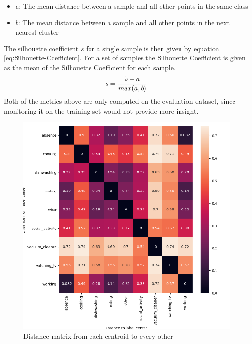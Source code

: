 \begin{itemize}
\setlength\itemsep{0em}
    \item $a$: The mean distance between a sample and all other points in the same class
    \item $b$: The mean distance between a sample and all other points in the next nearest cluster
\end{itemize}
The silhouette coefficient $s$ for a single sample is then given by equation \ref{eq:Silhouette-Coefficient}. For a set of samples the Silhouette Coefficient is given as the mean of the Silhouette Coefficient for each sample.
\begin{equation}
    \centering
    \begin{gathered}
        s = \frac{b - a}{max(a, b)}
    \end{gathered}
    \label{eq:Silhouette-Coefficient}
\end{equation}
Both of the metrics above are only computed on the evaluation dataset, since monitoring it on the training set would not provide more insight.
\begin{figure}[htbp]
	\centering
	\includegraphics[scale=0.35]{img/Distance_Metric.png}
	\caption{Distance matrix from each centroid to every other}
	\label{fig:Distance-Matrix}
\end{figure}

